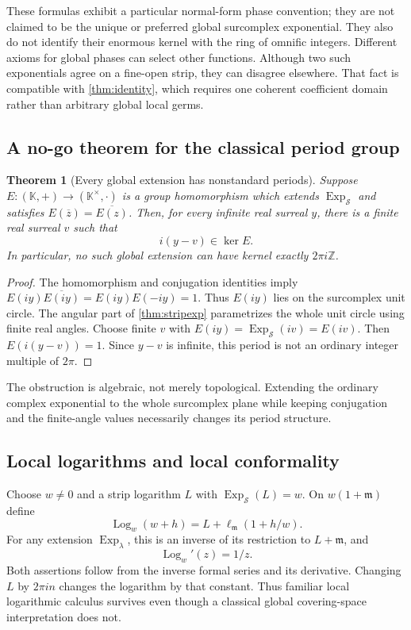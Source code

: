 \documentclass[11pt,letterpaper]{article}
\numberwithin{equation}{section}
\newtheorem{theorem}{Theorem}[section]
\theoremstyle{definition}
\theoremstyle{remark}
\newcommand{\K}{\mathbb{K}}
\newcommand{\Z}{\mathbb{Z}}
\newcommand{\mm}{\mathfrak{m}}
\newcommand{\Exp}{\operatorname{Exp}}
\newcommand{\Log}{\operatorname{Log}}
\begin{document}
These formulas exhibit a particular normal-form phase convention; they are
not claimed to be the unique or preferred global surcomplex exponential.
They also do not identify their enormous kernel with the ring of omnific
integers. Different axioms for global phases can select other functions.
Although two such exponentials agree on a fine-open strip, they can disagree
elsewhere. That fact is compatible with \cref{thm:identity}, which requires
one coherent coefficient domain rather than arbitrary global local germs.

\subsection{A no-go theorem for the classical period group}

\begin{theorem}[Every global extension has nonstandard periods]\label{thm:periodobstruction}
Suppose $E:(\K,+)\to(\K^\times,\cdot)$ is a group homomorphism which
extends $\Exp_{\mathcal S}$ and satisfies
$E(\overline z)=\overline{E(z)}$. Then, for every infinite real surreal $y$,
there is a finite real surreal $v$ such that
\begin{equation}\label{eq:periodobstruction}
 i(y-v)\in\ker E.
\end{equation}
In particular, no such global extension can have kernel exactly
$2\pi i\Z$.
\end{theorem}
\begin{proof}
The homomorphism and conjugation identities imply
$E(iy)\overline{E(iy)}=E(iy)E(-iy)=1$. Thus $E(iy)$ lies on the surcomplex
unit circle. The angular part of \cref{thm:stripexp} parametrizes the whole
unit circle using finite real angles. Choose finite $v$ with
$E(iy)=\Exp_{\mathcal S}(iv)=E(iv)$. Then $E(i(y-v))=1$.
Since $y-v$ is infinite, this period is not an ordinary integer multiple of
$2\pi$.
\end{proof}

The obstruction is algebraic, not merely topological. Extending the ordinary
complex exponential to the whole surcomplex plane while keeping conjugation
and the finite-angle values necessarily changes its period structure.

\subsection{Local logarithms and local conformality}

Choose $w\ne0$ and a strip logarithm $L$ with
$\Exp_{\mathcal S}(L)=w$. On $w(1+\mm)$ define
\begin{equation}\label{eq:locallog}
 \Log_w(w+h)=L+\ell_{\mm}(1+h/w).
\end{equation}
For any extension $\Exp_\lambda$, this is an inverse of its restriction to
$L+\mm$, and
\[
 \Log_w'(z)=1/z.
\]
Both assertions follow from the inverse formal series and its derivative.
Changing $L$ by $2\pi i n$ changes the logarithm by that constant. Thus
familiar local logarithmic calculus survives even though a classical global
covering-space interpretation does not.
\end{document}
